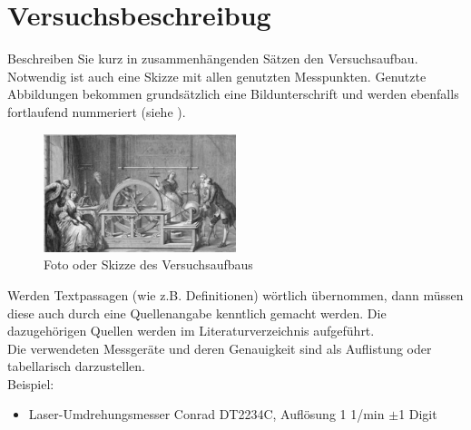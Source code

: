 \section{Versuchsbeschreibug}
\label{section:Versuchsbeschreibung}
Beschreiben Sie kurz in zusammenhängenden Sätzen den Versuchsaufbau. Notwendig ist auch eine Skizze mit allen genutzten Messpunkten. Genutzte Abbildungen bekommen grundsätzlich eine Bildunterschrift und werden ebenfalls fortlaufend nummeriert (siehe ).\\

%
\begin{figure}[!h]
		\centering
		\includegraphics[width=0.5\textwidth]{Abbildungen/Beispielbild_Versuchsaufbau.eps}
		\caption{Foto oder Skizze des Versuchsaufbaus}
		\label{fig:BspVers}
\end{figure}
%
Werden Textpassagen (wie z.B. Definitionen) wörtlich übernommen, dann müssen diese auch durch eine Quellenangabe kenntlich gemacht werden. Die dazugehörigen Quellen werden im Literaturverzeichnis aufgeführt.\\

Die verwendeten Messgeräte und deren Genauigkeit sind als Auflistung oder tabellarisch darzustellen.\\

Beispiel:
%
\begin{itemize}
\item Laser-Umdrehungsmesser Conrad DT2234C, Auflösung 1 1/min $\pm$1 Digit
\end{itemize}
%
